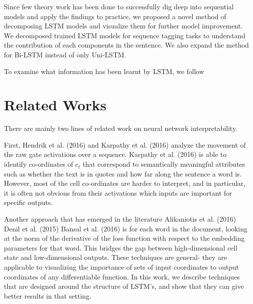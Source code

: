 \documentclass{article}
\begin{document}
Since few theory work has been done to successfully dig deep into sequential models and apply the findings to practice, we proposed a novel method of decomposing LSTM models and visualize them for further model improvement. 
We decomposed trained LSTM models for sequence tagging tasks to understand the contribution of each components in the sentence. We also expand the method for Bi-LSTM instead of only Uni-LSTM.

To examine what information has been learnt by LSTM, we follow



\section{Related Works}

There are mainly two lines of related work on neural network interpretability.


First, Hendrik et al. (2016) and Karpathy et al. (2016) analyze the movement of the raw gate activations over a sequence.
Karpathy et al. (2016) is able to identify co-ordinates of $c_t$ that correspond to semantically meaningful attributes such as whether the text is in quotes and how far along the sentence a word is. However, most of the cell co-ordinates are harder to interpret, and in particular, it is often not obvious from their activations which inputs are important for specific outputs.

Another approach that has emerged in the literature Alikaniotis et al. (2016) Denil et al. (2015) Bansal et al. (2016) is for each word in the document, looking at the norm of the derivative of the loss function with respect to the embedding parameters for that word. This bridges the gap between high-dimensional cell state and low-dimensional outputs. These techniques are general- they are applicable to visualizing the importance of sets of input coordinates to output coordinates of any differentiable function. In this work, we describe techniques that are designed around the structure of LSTM’s, and show that they can give better results in that setting.

\end{document}
